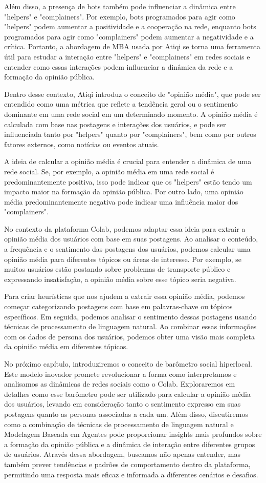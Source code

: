 Além disso, a presença de bots também pode influenciar a dinâmica entre "helpers" e "complainers". Por exemplo, bots programados para agir como "helpers" podem aumentar a positividade e a cooperação na rede, enquanto bots programados para agir como "complainers" podem aumentar a negatividade e a crítica. Portanto, a abordagem de MBA usada por Atiqi se torna uma ferramenta útil para estudar a interação entre "helpers" e "complainers" em redes sociais e entender como essas interações podem influenciar a dinâmica da rede e a formação da opinião pública.

Dentro desse contexto, Atiqi introduz o conceito de "opinião média", que pode ser entendido como uma métrica que reflete a tendência geral ou o sentimento dominante em uma rede social em um determinado momento. A opinião média é calculada com base nas postagens e interações dos usuários, e pode ser influenciada tanto por "helpers" quanto por "complainers", bem como por outros fatores externos, como notícias ou eventos atuais.

A ideia de calcular a opinião média é crucial para entender a dinâmica de uma rede social. Se, por exemplo, a opinião média em uma rede social é predominantemente positiva, isso pode indicar que os "helpers" estão tendo um impacto maior na formação da opinião pública. Por outro lado, uma opinião média predominantemente negativa pode indicar uma influência maior dos "complainers".

No contexto da plataforma Colab, podemos adaptar essa ideia para extrair a opinião média dos usuários com base em suas postagens. Ao analisar o conteúdo, a frequência e o sentimento das postagens dos usuários, podemos calcular uma opinião média para diferentes tópicos ou áreas de interesse. Por exemplo, se muitos usuários estão postando sobre problemas de transporte público e expressando insatisfação, a opinião média sobre esse tópico seria negativa.

Para criar heurísticas que nos ajudem a extrair essa opinião média, podemos começar categorizando postagens com base em palavras-chave ou tópicos específicos. Em seguida, podemos analisar o sentimento dessas postagens usando técnicas de processamento de linguagem natural. Ao combinar essas informações com os dados de persona dos usuários, podemos obter uma visão mais completa da opinião média em diferentes tópicos.

No próximo capítulo, introduziremos o conceito de barômetro social hiperlocal. Este modelo inovador promete revolucionar a forma como interpretamos e analisamos as dinâmicas de redes sociais como o Colab. Exploraremos em detalhes como esse barômetro pode ser utilizado para calcular a opinião média dos usuários, levando em consideração tanto o sentimento expresso em suas postagens quanto as personas associadas a cada um. Além disso, discutiremos como a combinação de técnicas de processamento de linguagem natural e Modelagem Baseada em Agentes pode proporcionar insights mais profundos sobre a formação da opinião pública e a dinâmica de interação entre diferentes grupos de usuários. Através dessa abordagem, buscamos não apenas entender, mas também prever tendências e padrões de comportamento dentro da plataforma, permitindo uma resposta mais eficaz e informada a diferentes cenários e desafios.